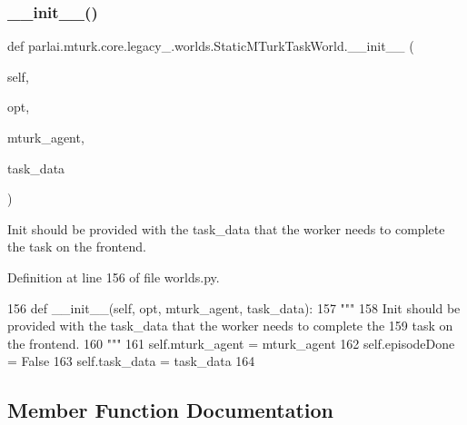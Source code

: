 \subsubsection{\texorpdfstring{\+\_\+\+\_\+init\+\_\+\+\_\+()}{\_\_init\_\_()}}
{\footnotesize\ttfamily def parlai.\+mturk.\+core.\+legacy\+\_.\+worlds.\+Static\+M\+Turk\+Task\+World.\+\_\+\+\_\+init\+\_\+\+\_\+ (\begin{DoxyParamCaption}\item[{}]{self,  }\item[{}]{opt,  }\item[{}]{mturk\+\_\+agent,  }\item[{}]{task\+\_\+data }\end{DoxyParamCaption})}

\begin{DoxyVerb}Init should be provided with the task_data that the worker needs to complete the
task on the frontend.
\end{DoxyVerb}
 

Definition at line 156 of file worlds.\+py.


\begin{DoxyCode}
156     \textcolor{keyword}{def }\_\_init\_\_(self, opt, mturk\_agent, task\_data):
157         \textcolor{stringliteral}{"""}
158 \textcolor{stringliteral}{        Init should be provided with the task\_data that the worker needs to complete the}
159 \textcolor{stringliteral}{        task on the frontend.}
160 \textcolor{stringliteral}{        """}
161         self.mturk\_agent = mturk\_agent
162         self.episodeDone = \textcolor{keyword}{False}
163         self.task\_data = task\_data
164 
\end{DoxyCode}


\subsection{Member Function Documentation}
\mbox{\label{classparlai_1_1mturk_1_1core_1_1legacy__2018_1_1worlds_1_1StaticMTurkTaskWorld_af07d98eed07ddf1be2fa16310b4bf405}} 
